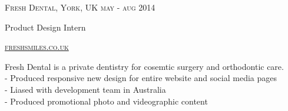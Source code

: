 {
  \textsc{\small{Fresh Dental, York, UK
      \hfill
          {\raggedleft
              may - aug 2014
          } \\
      }
  }
  {\raggedright\large {
    Product Design Intern
  } \\}

  \textsc{\small\href{http://www.freshsmiles.co.uk}{freshsmiles.co.uk}}

  \normalsize{
    Fresh Dental is a private dentistry for cosemtic surgery and orthodontic care. \\
    - Produced responsive new design for entire website and social media pages \\
    - Liased with development team in Australia \\
    - Produced promotional photo and videographic content
  }
}
